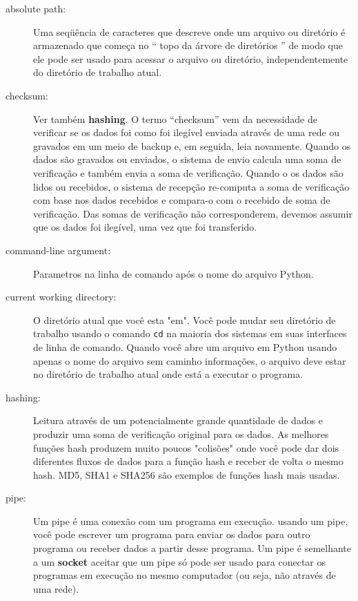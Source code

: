 \documentclass{book}
\begin{document}
\begin{description}

\item[absolute path:] Uma seqüência de caracteres que descreve onde um arquivo ou
diretório é armazenado que começa no `` topo da árvore de diretórios ''
de modo que ele pode ser usado para acessar o arquivo ou diretório, independentemente
do diretório de trabalho atual.

\item [checksum:] Ver também {\bf hashing}. O termo ``checksum''
vem da necessidade de verificar se os dados foi como foi ilegível
enviada através de uma rede ou gravados em um meio de backup e, em seguida,
leia novamente. Quando os dados são gravados ou enviados, o sistema de envio
calcula uma soma de verificação e também envia a soma de verificação. Quando o
os dados são lidos ou recebidos, o sistema de recepção re-computa
a soma de verificação com base nos dados recebidos e compara-o com o
recebido de soma de verificação. Das somas de verificação não corresponderem, devemos
assumir que os dados foi ilegível, uma vez que foi transferido.

\item[command-line argument:] Parametros na linha de comando após o nome do arquivo Python.

\item[current working directory:] O diretório atual que você
esta "em". Você pode mudar seu diretório de trabalho usando o
comando {\tt cd} na maioria dos sistemas em suas interfaces de linha de comando.
Quando você abre um arquivo em Python usando apenas o nome do arquivo sem caminho
informações, o arquivo deve estar no diretório de trabalho atual
onde está a executar o programa.


\item[hashing:] Leitura através de um potencialmente grande quantidade de dados
e produzir uma soma de verificação original para os dados. As melhores funções hash
produzem muito poucos "colisões" onde você pode dar dois diferentes
fluxos de dados para a função hash e receber de volta o mesmo hash.
MD5, SHA1 e SHA256 são exemplos de funções hash mais usadas.

\item[pipe:] Um pipe é uma conexão com um programa em execução. usando
um pipe, você pode escrever um programa para enviar os dados para outro programa
ou receber dados a partir desse programa. Um pipe é semelhante a um
{\bf socket} aceitar que um pipe só pode ser usado para
conectar os programas em execução no mesmo computador (ou seja, não
através de uma rede).


\end{description}
\end{document}
